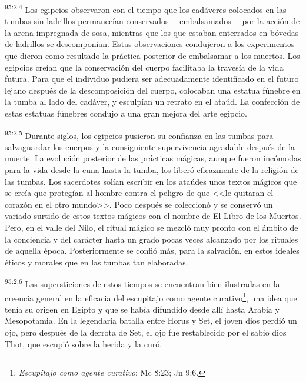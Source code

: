 \par
\textsuperscript{95:2.4} Los egipcios observaron con el tiempo que los cadáveres colocados en las tumbas sin ladrillos permanecían conservados ---embalsamados--- por la acción de la arena impregnada de sosa, mientras que los que estaban enterrados en bóvedas de ladrillos se descomponían. Estas observaciones condujeron a los experimentos que dieron como resultado la práctica posterior de embalsamar a los muertos. Los egipcios creían que la conservación del cuerpo facilitaba la travesía de la vida futura. Para que el individuo pudiera ser adecuadamente identificado en el futuro lejano después de la descomposición del cuerpo, colocaban una estatua fúnebre en la tumba al lado del cadáver, y esculpían un retrato en el ataúd. La confección de estas estatuas fúnebres condujo a una gran mejora del arte egipcio.

\par
\textsuperscript{95:2.5} Durante siglos, los egipcios pusieron su confianza en las tumbas para salvaguardar los cuerpos y la consiguiente supervivencia agradable después de la muerte. La evolución posterior de las prácticas mágicas, aunque fueron incómodas para la vida desde la cuna hasta la tumba, los liberó eficazmente de la religión de las tumbas. Los sacerdotes solían escribir en los ataúdes unos textos mágicos que se creía que protegían al hombre contra el peligro de que <<le quitaran el corazón en el otro mundo>>. Poco después se coleccionó y se conservó un variado surtido de estos textos mágicos con el nombre de El Libro de los Muertos. Pero, en el valle del Nilo, el ritual mágico se mezcló muy pronto con el ámbito de la conciencia y del carácter hasta un grado pocas veces alcanzado por los rituales de aquella época. Posteriormente se confió más, para la salvación, en estos ideales éticos y morales que en las tumbas tan elaboradas.

\par
\textsuperscript{95:2.6} Las supersticiones de estos tiempos se encuentran bien ilustradas en la creencia general en la eficacia del escupitajo como agente curativo\footnote{\textit{Escupitajo como agente curativo}: Mc 8:23; Jn 9:6.}, una idea que tenía su origen en Egipto y que se había difundido desde allí hasta Arabia y Mesopotamia. En la legendaria batalla entre Horus y Set, el joven dios perdió un ojo, pero después de la derrota de Set, el ojo fue restablecido por el sabio dios Thot, que escupió sobre la herida y la curó.

